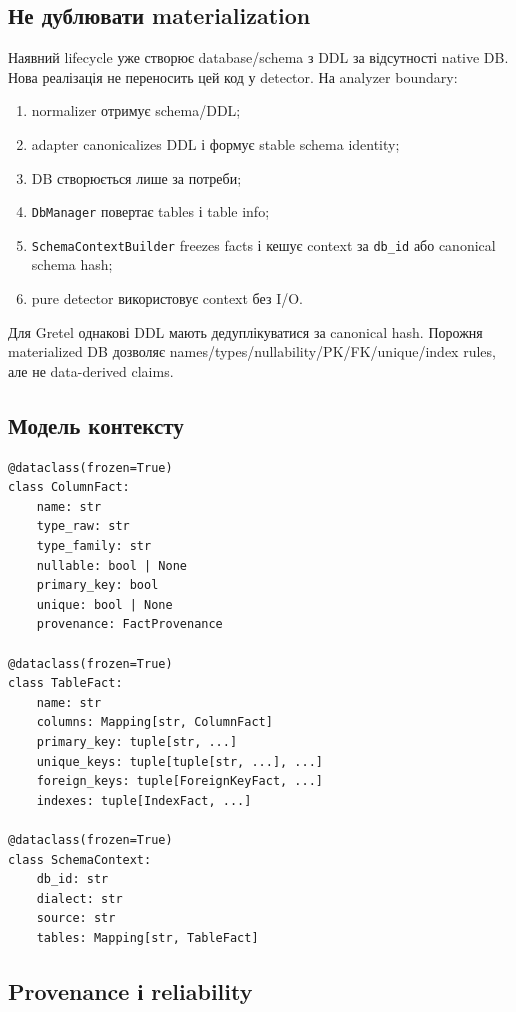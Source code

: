 \documentclass[11pt,a4paper]{article}
\begin{document}
\subsection{Не дублювати materialization}

Наявний lifecycle уже створює database/schema з DDL за відсутності native DB.
Нова реалізація не переносить цей код у detector. На analyzer boundary:

\begin{enumerate}
\item normalizer отримує schema/DDL;
\item adapter canonicalizes DDL і формує stable schema identity;
\item DB створюється лише за потреби;
\item \texttt{DbManager} повертає tables і table info;
\item \texttt{SchemaContextBuilder} freezes facts і кешує context за \texttt{db\_id}
      або canonical schema hash;
\item pure detector використовує context без I/O.
\end{enumerate}

Для Gretel однакові DDL мають дедуплікуватися за canonical hash. Порожня materialized
DB дозволяє names/types/nullability/PK/FK/unique/index rules, але не data-derived
claims.

\subsection{Модель контексту}

\begin{lstlisting}[style=pythonstyle]
@dataclass(frozen=True)
class ColumnFact:
    name: str
    type_raw: str
    type_family: str
    nullable: bool | None
    primary_key: bool
    unique: bool | None
    provenance: FactProvenance

@dataclass(frozen=True)
class TableFact:
    name: str
    columns: Mapping[str, ColumnFact]
    primary_key: tuple[str, ...]
    unique_keys: tuple[tuple[str, ...], ...]
    foreign_keys: tuple[ForeignKeyFact, ...]
    indexes: tuple[IndexFact, ...]

@dataclass(frozen=True)
class SchemaContext:
    db_id: str
    dialect: str
    source: str
    tables: Mapping[str, TableFact]
\end{lstlisting}

\subsection{Provenance і reliability}
\end{document}
